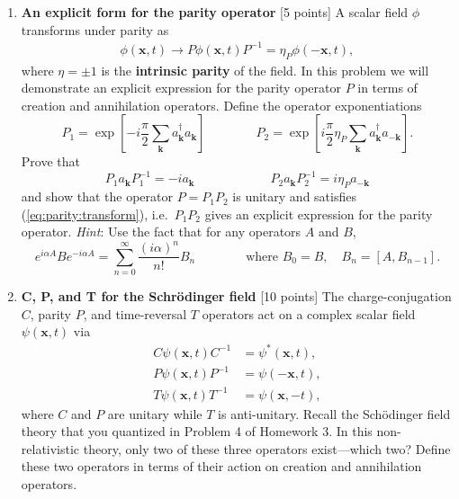\documentclass[12pt]{article}
\begin{document}
\begin{enumerate}
\item \textbf{An explicit form for the parity operator} [5 points]
%
A scalar field $\phi$ transforms under parity as
\begin{align}
	\phi(\mathbf{x},t) \to P\phi(\mathbf{x},t)P^{-1} = \eta_P \phi(-\mathbf{x},t),\label{eq:parity:transform}\tag{\textasteriskcentered}
\end{align}
 where $\eta = \pm 1$ is the \textbf{intrinsic parity} of the field. In this problem we will demonstrate an explicit expression for the parity operator $P$ in terms of creation and annihilation operators. Define the operator exponentiations
$$P_1 = \exp\left[-i\frac{\pi}{2} \sum_\mathbf{k} a^\dag_\mathbf{k}a_\mathbf{k}\right]
\qquad\qquad
P_2 = \exp\left[i\frac{\pi}{2}\eta_P \sum_\mathbf{k} a^\dag_\mathbf{k}a_{-\mathbf{k}}\right].$$
Prove that
$$P_1 a_\mathbf{k} P_1^{-1} = -ia_\mathbf{k} \qquad\qquad\qquad
P_2 a_\mathbf{k} P_2^{-1} = i\eta_P a_{-\mathbf{k}}$$ %
and show that the operator $P=P_1P_2$ is unitary and satisfies (\ref{eq:parity:transform}), i.e.\ $P_1P_2$ gives an explicit expression for the parity operator.  \textit{Hint}: Use the fact that for any operators $A$ and $B$,
$$e^{i\alpha A} B e^{-i\alpha A} = \sum_{n=0}^\infty \frac{(i\alpha)^n}{n!}B_n
\qquad\qquad\text{where } B_0=B,\quad B_n=[A,B_{n-1}].
$$


 \vspace*{0.5cm}

\item {\bf C, P, and T for the Schr\"odinger field} [10 points]
%
The charge-conjugation $C$, parity $P$, and time-reversal $T$ operators act on a complex scalar field $\psi(\mathbf{x},t)$ via
\begin{align*}
	C \psi(\mathbf{x},t) C^{-1} &= \psi^*(\mathbf{x},t),\\
	P \psi(\mathbf{x},t) P^{-1} &= \psi(-\mathbf{x},t),\\
	T \psi(\mathbf{x},t) T^{-1} &= \psi(\mathbf{x},-t),
\end{align*}
where $C$ and $P$ are unitary while $T$ is anti-unitary. Recall the Sch\"odinger field theory that you quantized in Problem 4 of Homework 3. In this non-relativistic theory, only two of these three operators exist---which two? Define these two operators in terms of their action on creation and annihilation operators.



 \vspace*{0.5cm}


\end{enumerate}
\end{document}
